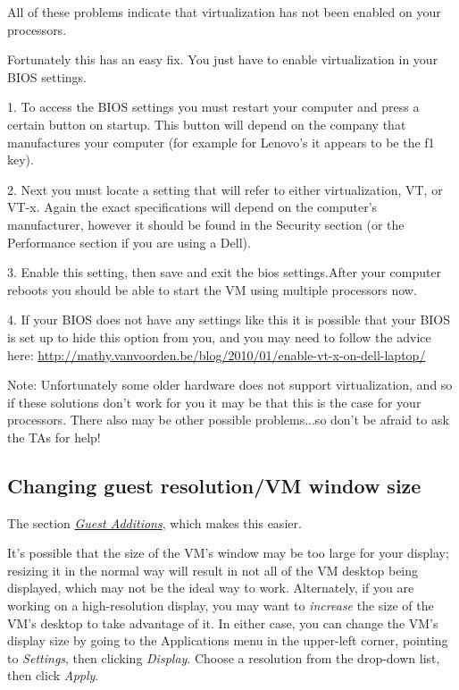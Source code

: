 \documentclass[letterpaper,10pt,english]{sphinxmanual}
\begin{document}
All of these problems indicate that virtualization has not been enabled on your processors.

Fortunately this has an easy fix. You just have to enable virtualization in your BIOS
settings.

1. To  access the BIOS settings you must restart your computer and press a certain
button on startup. This button will depend on the company that manufactures your computer
(for example for Lenovo's it appears to be the f1 key).

2. Next you must locate a setting that will refer to either virtualization, VT, or VT-x.
Again the exact specifications will depend on the computer's manufacturer, however
it should be found in the Security section (or the Performance section if you are using a Dell).

3. Enable this setting,
then save and exit the bios settings.After your computer reboots you should be able to start the VM using multiple processors now.

4. If your BIOS does not have any settings like this it is possible that your BIOS is set up to hide this option from you, and you
may need to follow the advice here: \href{http://mathy.vanvoorden.be/blog/2010/01/enable-vt-x-on-dell-laptop/}{http://mathy.vanvoorden.be/blog/2010/01/enable-vt-x-on-dell-laptop/}

Note: Unfortunately some older hardware does not support virtualization, and so if these solutions don't work for you it may
be that this is the case for your processors. There also may be other possible problems...so don't be afraid to ask the TAs for help!


\subsection{Changing guest resolution/VM window size}
\label{vm:changing-guest-resolution-vm-window-size}



The section {\hyperref[vm:vm-additions]{\emph{Guest Additions}}}, which makes this easier.



It's possible that the size of the VM's window may be too large for
your display; resizing it in the normal way will result in not all of
the VM desktop being displayed, which may not be the ideal way to
work.  Alternately, if you are working on a high-resolution display,
you may want to \emph{increase} the size of the VM's desktop to take
advantage of it.  In either case, you can change the VM's display size
by going to the Applications menu in the upper-left corner, pointing to
\emph{Settings}, then clicking \emph{Display}.  Choose a resolution from the
drop-down list, then click \emph{Apply}.
\end{document}
